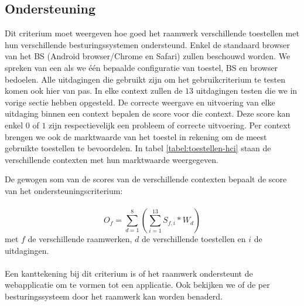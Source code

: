 
\subsection{Ondersteuning}
\label{sec:vergelijking-ondersteuning}
Dit criterium moet weergeven hoe goed het raamwerk verschillende toestellen met hun verschillende besturingssystemen ondersteund.
Enkel de standaard browser van het BS (Android browser/Chrome en Safari) zullen beschouwd worden.
We spreken van een  als we één bepaalde configuratie van toestel, BS en browser bedoelen.
Alle uitdagingen die gebruikt zijn om het gebruikcriterium te testen komen ook hier van pas.
In elke context zullen de $13$ uitdagingen testen die we in vorige sectie hebben opgesteld.
De correcte weergave en uitvoering van elke uitdaging binnen een context bepalen de score voor die context.
Deze score kan enkel $0$ of $1$ zijn respectievelijk een probleem of correcte uitvoering.
Per context brengen we ook de marktwaarde van het toestel in rekening om de meest gebruikte toestellen te bevoordelen.
In tabel \ref{tabel:toestellen-hci} staan de verschillende contexten met hun marktwaarde weergegeven.

De gewogen som van de scores van de verschillende contexten bepaalt de score van het ondersteuningscriterium:
\paragraph{}
\begin{equation}
  O_f = \sum_{d=1}^{8}{\left(\sum_{i=1}^{13}S_{f,i}*W_d\right)}
  \label{eq:ondersteuning}
\end{equation}
met $f$ de verschillende raamwerken,  $d$ de verschillende toestellen en $i$ de uitdagingen. 
\paragraph{}
Een kanttekening bij dit criterium is of het raamwerk ondersteunt de webapplicatie om te vormen tot een  applicatie. 
Ook bekijken we of de  per besturingssysteem door het raamwerk kan worden benaderd.

